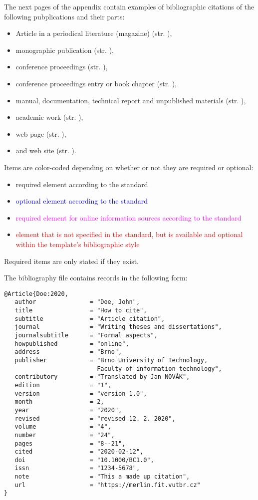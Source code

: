 The next pages of the appendix contain examples of bibliographic citations of the following pubplications and their parts:
\begin{itemize}
   \item Article in a periodical literature (magazine) (str. \pageref{pr-casopis-clanek}),
   \item monographic publication (str. \pageref{pr-monografie}),
   \item conference proceedings (str. \pageref{pr-sbornik}),
   \item conference proceedings entry or book chapter (str. \pageref{pr-kapitola}),
   \item manual, documentation, technical report and unpublished materials (str. \pageref{pr-manual}),
   \item academic work (str. \pageref{pr-thesis}),
   \item web page (str. \pageref{pr-webpage}),
   \item and web site (str. \pageref{pr-website}).
\end{itemize}

\noindent Items are color-coded depending on whether or not they are required or optional:
\begin{itemize}
    \item required element according to the standard
    \item \textcolor{blue}{optional element according to the standard}
    \item \textcolor{magenta}{required element for online information sources according to the standard}
    \item \textcolor{red}{element that is not specified in the standard, but is available and optional within the template's bibliographic style}
\end{itemize}
Required items are only stated if they exist.

\newpage
The bibliography file contains records in the following form:
\begin{verbatim}
@Article{Doe:2020,
   author               = "Doe, John",
   title                = "How to cite",
   subtitle             = "Article citation",
   journal              = "Writing theses and dissertations",
   journalsubtitle      = "Formal aspects",
   howpublished         = "online",
   address              = "Brno",
   publisher            = "Brno University of Technology, 
                          Faculty of information technology",
   contributory         = "Translated by Jan NOVÁK",
   edition              = "1",
   version              = "version 1.0",
   month                = 2,
   year                 = "2020",
   revised              = "revised 12. 2. 2020",
   volume               = "4",
   number               = "24",
   pages                = "8--21",
   cited                = "2020-02-12",
   doi                  = "10.1000/BC1.0",
   issn                 = "1234-5678",
   note                 = "This a made up citation",
   url                  = "https://merlin.fit.vutbr.cz"
}
\end{verbatim}


